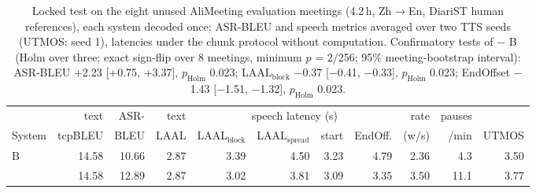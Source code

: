 \begin{table}[t]
\centering\small
\setlength{\tabcolsep}{3.5pt}
\begin{tabular}{lrrrrrrrrrr}
\toprule
 & text & ASR- & text & \multicolumn{4}{c}{speech latency (s)} & rate & pauses & \\
\cmidrule(lr){5-8}
System & tcpBLEU & BLEU & LAAL & LAAL$_\text{block}$ & LAAL$_\text{spread}$ & start & EndOff. & (w/s) & /min & UTMOS \\
\midrule
B & 14.58 & 10.66 & 2.87 & 3.39 & 4.50 & 3.23 & 4.79 & 2.36 & 4.3 & 3.50 \\
\sys{} & 14.58 & 12.89 & 2.87 & 3.02 & 3.81 & 3.09 & 3.35 & 3.50 & 11.1 & 3.77 \\
\bottomrule
\end{tabular}
\caption{Locked test on the eight unused AliMeeting evaluation meetings (4.2\,h, Zh$\rightarrow$En, DiariST human references), each system decoded once; ASR-BLEU and speech metrics averaged over two TTS seeds (UTMOS: seed 1), latencies under the chunk protocol without computation. Confirmatory tests of \sys{} $-$ B (Holm over three; exact sign-flip over 8 meetings, minimum $p$ = 2/256; 95\% meeting-bootstrap interval): ASR-BLEU +2.23 [+0.75, +3.37], $p_\text{Holm}$ 0.023; LAAL$_\text{block}$ $-$0.37 [$-$0.41, $-$0.33], $p_\text{Holm}$ 0.023; EndOffset $-$1.43 [$-$1.51, $-$1.32], $p_\text{Holm}$ 0.023.}
\label{tab:alieval}
\end{table}
